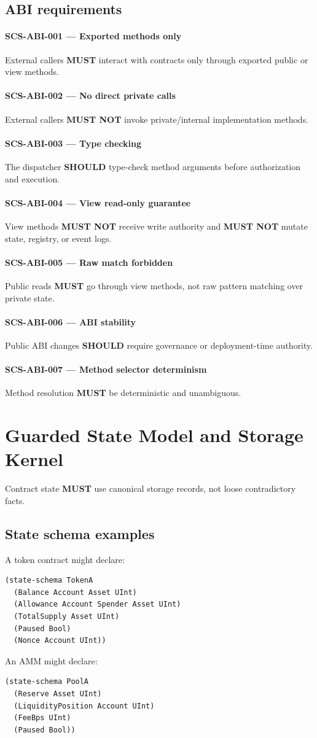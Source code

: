 \documentclass[11pt]{article}
\newcommand{\MUST}{\textbf{MUST}}
\newcommand{\MUSTNOT}{\textbf{MUST NOT}}
\newcommand{\SHOULD}{\textbf{SHOULD}}
\newcommand{\req}[2]{\paragraph{#1}#2\par}
\begin{document}
\subsection{ABI requirements}

\req{SCS-ABI-001 --- Exported methods only}{External callers \MUST{} interact with contracts only through exported public or view methods.}

\req{SCS-ABI-002 --- No direct private calls}{External callers \MUSTNOT{} invoke private/internal implementation methods.}

\req{SCS-ABI-003 --- Type checking}{The dispatcher \SHOULD{} type-check method arguments before authorization and execution.}

\req{SCS-ABI-004 --- View read-only guarantee}{View methods \MUSTNOT{} receive write authority and \MUSTNOT{} mutate state, registry, or event logs.}

\req{SCS-ABI-005 --- Raw match forbidden}{Public reads \MUST{} go through view methods, not raw pattern matching over private state.}

\req{SCS-ABI-006 --- ABI stability}{Public ABI changes \SHOULD{} require governance or deployment-time authority.}

\req{SCS-ABI-007 --- Method selector determinism}{Method resolution \MUST{} be deterministic and unambiguous.}



\section{Guarded State Model and Storage Kernel}

Contract state \MUST{} use canonical storage records, not loose contradictory facts.

\subsection{State schema examples}

A token contract might declare:

\begin{lstlisting}
(state-schema TokenA
  (Balance Account Asset UInt)
  (Allowance Account Spender Asset UInt)
  (TotalSupply Asset UInt)
  (Paused Bool)
  (Nonce Account UInt))
\end{lstlisting}

An AMM might declare:

\begin{lstlisting}
(state-schema PoolA
  (Reserve Asset UInt)
  (LiquidityPosition Account UInt)
  (FeeBps UInt)
  (Paused Bool))
\end{lstlisting}
\end{document}
